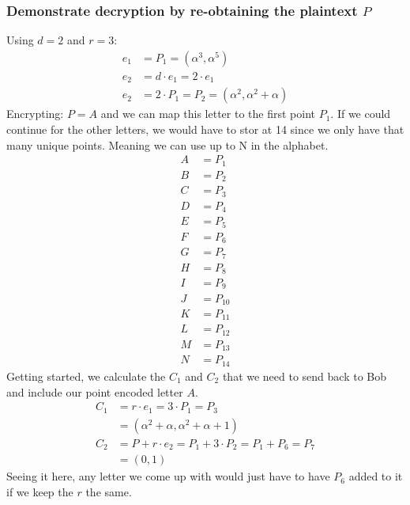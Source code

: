 \documentclass[a4paper,11pt]{exam}
\begin{document}
\subsubsection{Demonstrate decryption by re-obtaining the plaintext \(P\)}
\label{sec:orgd6ac3f6}
Using \(d = 2\) and \(r = 3\):
\begin{align*}
e_1 &= P_1 = (\alpha^3, \alpha^5)\\
e_2 &= d\cdot e_1 = 2\cdot e_1\\
e_2 &= 2\cdot P_1 = P_2 = (\alpha^2, \alpha^2+\alpha)
\end{align*}
Encrypting: \(P = A\) and we can map this letter to the first point \(P_1\). If we could continue for the other letters, we would have to stor at 14 since we only have that many unique points. Meaning we can use up to N in the alphabet.
\begin{align}
A &= P_{1}\\
B &= P_{2}\\
C &= P_{3}\\
D &= P_{4}\\
E &= P_{5}\\
F &= P_{6}\\
G &= P_{7}\\
H &= P_{8}\\
I &= P_{9}\\
J &= P_{10}\\
K &= P_{11}\\
L &= P_{12}\\
M &= P_{13}\\
N &= P_{14}
\end{align}
Getting started, we calculate the \(C_1\) and \(C_2\) that we need to send back to Bob and include our point encoded letter \(A\). 
\begin{align*}
C_1 &= r\cdot e_1 = 3\cdot P_1 = P_3\\
    &= (\alpha^2+\alpha, \alpha^2+\alpha+1)\\
C_2 &= P + r\cdot e_2 = P_1 + 3\cdot P_2 = P_1 + P_6 = P_7\\
    &= (0, 1)
\end{align*}
Seeing it here, any letter we come up with would just have to have \(P_6\) added to it if we keep the \(r\) the same.
\end{document}
